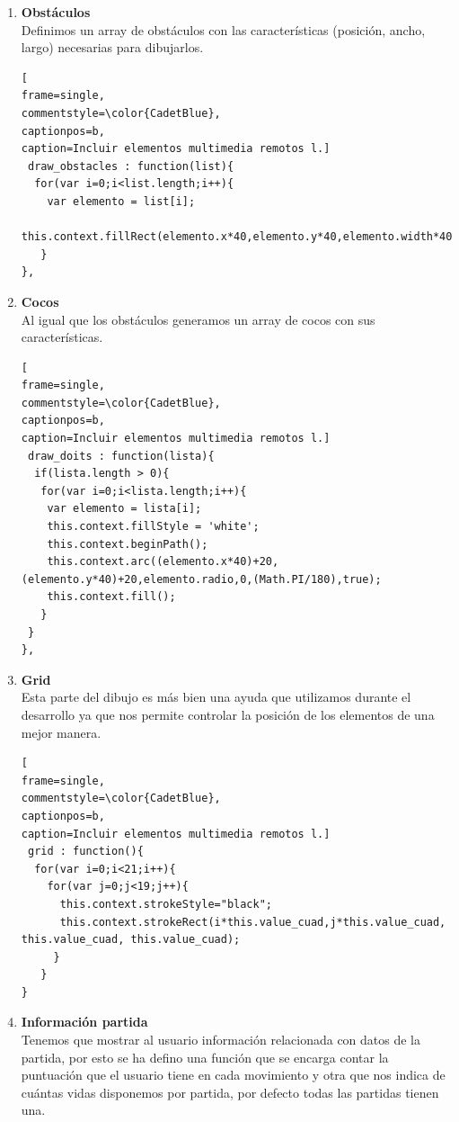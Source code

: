\begin{enumerate}
\item \textbf{Obstáculos} \\ Definimos un array de obstáculos con las características (posición, ancho, largo) necesarias
para dibujarlos.\lstset{language=C, breaklines=true, basicstyle=\footnotesize}
\lstset{numbers=left, numberstyle=\tiny, stepnumber=1, numbersep=-2pt}
\begin{lstlisting}[
frame=single,
commentstyle=\color{CadetBlue},
captionpos=b,
caption=Incluir elementos multimedia remotos l.]
 draw_obstacles : function(list){
  for(var i=0;i<list.length;i++){
    var elemento = list[i]; 
    this.context.fillRect(elemento.x*40,elemento.y*40,elemento.width*40,elemento.height*40);
   }
},
\end{lstlisting}
\item \textbf{Cocos} \\ Al igual que los obstáculos generamos un array de cocos con sus características.\lstset{language=, breaklines=true, basicstyle=\footnotesize}
\lstset{numbers=left, numberstyle=\tiny, stepnumber=1, numbersep=-2pt}
\begin{lstlisting}[
frame=single,
commentstyle=\color{CadetBlue},
captionpos=b,
caption=Incluir elementos multimedia remotos l.]
 draw_doits : function(lista){
  if(lista.length > 0){ 
   for(var i=0;i<lista.length;i++){ 
    var elemento = lista[i]; 
    this.context.fillStyle = 'white'; 
    this.context.beginPath(); 
    this.context.arc((elemento.x*40)+20,(elemento.y*40)+20,elemento.radio,0,(Math.PI/180),true);
    this.context.fill();
   }
 }
},
\end{lstlisting}
\item \textbf{Grid} \\ Esta parte del dibujo es más bien una ayuda que utilizamos durante el desarrollo ya que nos
permite controlar la posición de los elementos de una mejor manera.
\lstset{language=, breaklines=true, basicstyle=\footnotesize}
\lstset{numbers=left, numberstyle=\tiny, stepnumber=1, numbersep=-2pt}
\begin{lstlisting}[
frame=single,
commentstyle=\color{CadetBlue},
captionpos=b,
caption=Incluir elementos multimedia remotos l.]
 grid : function(){ 
  for(var i=0;i<21;i++){ 
    for(var j=0;j<19;j++){ 
      this.context.strokeStyle="black"; 
      this.context.strokeRect(i*this.value_cuad,j*this.value_cuad, this.value_cuad, this.value_cuad); 
     }
   }
} 
\end{lstlisting}
\item \textbf{Información partida} \\ Tenemos que mostrar al usuario información relacionada con datos de la partida, por esto se
ha defino una función que se encarga contar la puntuación que el usuario tiene en cada
movimiento y otra que nos indica de cuántas vidas disponemos por partida, por defecto
todas las partidas tienen una.


\end{enumerate}
